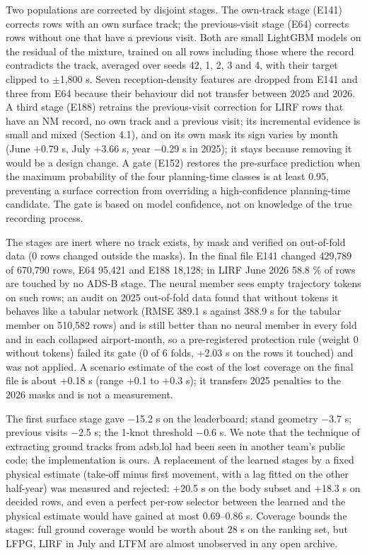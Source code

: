 \documentclass[
  manuscript=article,  %
  layout=preprint,     %
  year=2026,
  volume=4,
]{extra/joas}
\begin{document}
Two populations are corrected by disjoint stages. The own-track stage (E141) corrects rows with an own surface track; the previous-visit stage (E64) corrects rows without one that have a previous visit. Both are small LightGBM models on the residual of the mixture, trained on all rows including those where the record contradicts the track, averaged over seeds 42, 1, 2, 3 and 4, with their target clipped to $\pm$1,800 s. Seven reception-density features are dropped from E141 and three from E64 because their behaviour did not transfer between 2025 and 2026. A third stage (E188) retrains the previous-visit correction for LIRF rows that have an NM record, no own track and a previous visit; its incremental evidence is small and mixed (Section 4.1), and on its own mask its sign varies by month (June +0.79 s, July +3.66 s, year $-$0.29 s in 2025); it stays because removing it would be a design change. A gate (E152) restores the pre-surface prediction when the maximum probability of the four planning-time classes is at least 0.95, preventing a surface correction from overriding a high-confidence planning-time candidate. The gate is based on model confidence, not on knowledge of the true recording process.

The stages are inert where no track exists, by mask and verified on out-of-fold data (0 rows changed outside the masks). In the final file E141 changed 429,789 of 670,790 rows, E64 95,421 and E188 18,128; in LIRF June 2026 58.8 \% of rows are touched by no ADS-B stage. The neural member sees empty trajectory tokens on such rows; an audit on 2025 out-of-fold data found that without tokens it behaves like a tabular network (RMSE 389.1 s against 388.9 s for the tabular member on 510,582 rows) and is still better than no neural member in every fold and in each collapsed airport-month, so a pre-registered protection rule (weight 0 without tokens) failed its gate (0 of 6 folds, +2.03 s on the rows it touched) and was not applied. A scenario estimate of the cost of the lost coverage on the final file is about +0.18 s (range +0.1 to +0.3 s); it transfers 2025 penalties to the 2026 masks and is not a measurement.

The first surface stage gave $-$15.2 s on the leaderboard; stand geometry $-$3.7 s; previous visits $-$2.5 s; the 1-knot threshold $-$0.6 s. We note that the technique of extracting ground tracks from adsb.lol had been seen in another team's public code; the implementation is ours. A replacement of the learned stages by a fixed physical estimate (take-off minus first movement, with a lag fitted on the other half-year) was measured and rejected: +20.5 s on the body subset and +18.3 s on decided rows, and even a perfect per-row selector between the learned and the physical estimate would have gained at most 0.69--0.86 s. Coverage bounds the stages: full ground coverage would be worth about 28 s on the ranking set, but LFPG, LIRF in July and LTFM are almost unobserved in any open archive.
\end{document}

